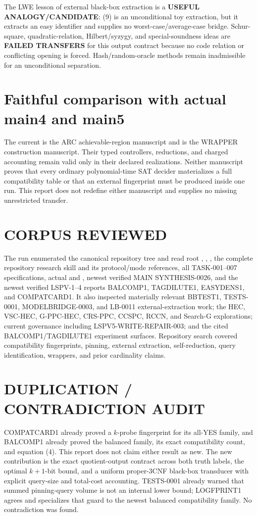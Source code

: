 \documentclass[11pt]{article}
\begin{document}
The LWE lesson of external black-box extraction is a \textbf{USEFUL
ANALOGY/CANDIDATE}: (9) is an unconditional toy extraction, but it extracts an
easy identifier and supplies no worst-case/average-case bridge.  Schur-square,
quadratic-relation, Hilbert/syzygy, and special-soundness ideas are
\textbf{FAILED TRANSFERS} for this output contract because no code relation or
conflicting opening is forced.  Hash/random-oracle methods remain
inadmissible for an unconditional separation.

\section{Faithful comparison with actual main4 and main5}
The current  is the ARC achievable-region manuscript and
 is the WRAPPER construction manuscript.  Their typed
controllers, reductions, and charged accounting remain valid only in their
declared realizations.  Neither manuscript proves that every ordinary
polynomial-time SAT decider materializes a full compatibility table or that
an external fingerprint must be produced inside one run.  This report does
not redefine either manuscript and supplies no missing unrestricted transfer.

\section{CORPUS REVIEWED}
The run enumerated the canonical repository tree and read root
, , , the complete repository
research skill and its protocol/mode references, all TASK-001--007
specifications, actual  and , newest verified
MAIN SYNTHESIS-0026, and the newest verified LSPV-1--4 reports BALCOMP1,
TAGDILUTE1, EASYDENS1, and COMPATCARD1.  It also inspected materially relevant
BBTEST1, TESTS-0001, MODELBRIDGE-0003, and LB-0011 external-extraction work;
the HEC, VSC-HEC, G-PPC-HEC, CRS-PPC, CCSPC, RCCN, and Search-G explorations;
current governance including LSPV5-WRITE-REPAIR-003; and the cited
BALCOMP1/TAGDILUTE1 experiment surfaces.  Repository search covered
compatibility fingerprints, pinning, external extraction, self-reduction,
query identification, wrappers, and prior cardinality claims.

\section{DUPLICATION / CONTRADICTION AUDIT}
COMPATCARD1 already proved a \(k\)-probe fingerprint for its all-YES family,
and BALCOMP1 already proved the balanced family, its exact compatibility
count, and equation (4).  This report does not claim either result as new.
The new contribution is the exact quotient-output contract across both truth
labels, the optimal \(k+1\)-bit bound, and a uniform proper-3CNF black-box
transducer with explicit query-size and total-cost accounting.  TESTS-0001
already warned that summed pinning-query volume is not an internal lower
bound; LOGFPRINT1 agrees and specializes that guard to the newest balanced
compatibility family.  No contradiction was found.
\end{document}
